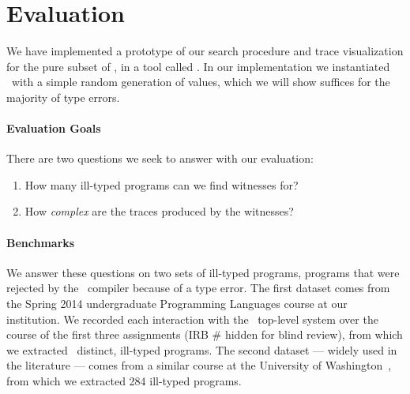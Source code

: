 \section{Evaluation}
\label{sec:evaluation}

We have implemented a prototype of our search procedure and trace
visualization for the pure subset of \ocaml, in a tool called \nanomaly.
In our implementation we instantiated \gensym\ with a simple random
generation of values, which we will show suffices for the
majority of type errors.

\paragraph{Evaluation Goals}
%
There are two questions we seek to answer with our evaluation:
%
\begin{enumerate}
\item {}
      How many ill-typed programs can we find witnesses for?
\item {}
      How \emph{complex} are the traces produced by the witnesses?
\end{enumerate}

\paragraph{Benchmarks}
We answer these questions on two sets of ill-typed programs, \ie
programs that were rejected by the \ocaml\ compiler because of a
type error.
%
The first dataset comes from the Spring 2014 undergraduate Programming
Languages course at our institution.
%
We recorded each interaction with the \ocaml\ top-level system over the
course of the first three assignments (IRB \# hidden for blind review), %
from which we extracted \ucsdsize\ distinct, ill-typed \ocaml programs.
%
The second dataset --- widely used in the literature --- comes from a
similar course at the University of Washington~\cite{lerner_seminal:_2006},
from which we extracted 284 ill-typed programs.

